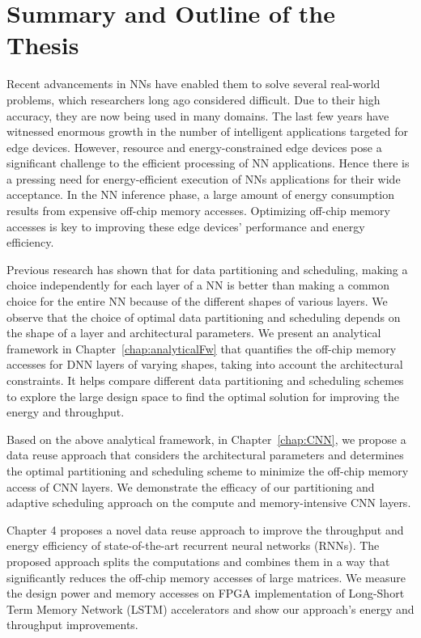 \section{Summary and Outline of the Thesis} 
Recent advancements in NNs have enabled them to solve several real-world problems, which researchers long ago considered difficult. Due to their high accuracy, they are now being used in many domains. The last few years have witnessed enormous growth in the number of intelligent applications targeted for edge devices. However, resource and energy-constrained edge devices pose a significant challenge to the efficient processing of NN applications. Hence there is a pressing need for energy-efficient execution of NNs applications for their wide acceptance. In the NN inference phase, a large amount of energy consumption results from expensive off-chip memory accesses. Optimizing off-chip memory accesses is key to improving these edge devices' performance and energy efficiency.

Previous research has shown that for data partitioning and scheduling, making a choice independently for each layer of a NN is better than making a common choice for the entire NN because of the different shapes of various layers. We observe that the choice of optimal data partitioning and scheduling depends on the shape of a layer and architectural parameters. We present an analytical framework in Chapter~\ref{chap:analyticalFw} that quantifies the off-chip memory accesses for DNN layers of varying shapes, taking into account the architectural constraints. It helps compare different data partitioning and scheduling schemes to explore the large design space to find the optimal solution for improving the energy and throughput. 

Based on the above analytical framework, in Chapter~\ref{chap:CNN}, we propose a data reuse approach that considers the architectural parameters and determines the optimal partitioning and scheduling scheme to minimize the off-chip memory access of CNN layers. We demonstrate the efficacy of our partitioning and adaptive scheduling approach on the compute and memory-intensive CNN layers. 

Chapter 4 proposes a novel data reuse approach to improve the throughput and energy efficiency of state-of-the-art recurrent neural networks (RNNs). The proposed approach splits the computations and combines them in a way that significantly reduces the off-chip memory accesses of large matrices. We measure the design power and memory accesses on FPGA implementation of Long-Short Term Memory Network (LSTM) accelerators and show our approach's energy and throughput improvements.

